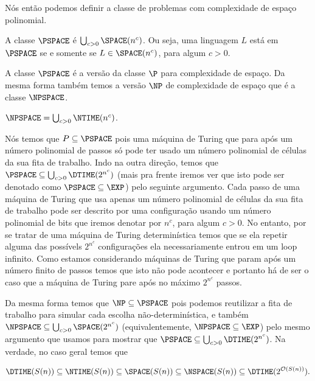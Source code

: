 Nós então podemos definir a classe de problemas com complexidade de espaço polinomial.

\begin{defi}  \label{pspace_defi}

    A classe $\PSPACE$ é $\bigcup_{c > 0} \SPACE(n^{c})$. Ou seja, uma linguagem $L$ está em $\PSPACE$ se e somente se $L \in \SPACE(n^{c})$, para algum $c > 0$.

\end{defi}

A classe $\PSPACE$ é a versão da classe $\P$ para complexidade de espaço. Da mesma forma também temos a versão $\NP$ de complexidade de espaço que é a classe $\NPSPACE$.

\begin{defi}  \label{npspace_defi}

    $\NPSPACE = \bigcup_{c > 0} \NTIME(n^{c})$.

\end{defi}

Nós temos que $P \subseteq \PSPACE$ pois uma máquina de Turing que para após um número polinomial de passos só pode ter usado um número polinomial de células da sua fita de trabalho. Indo na outra direção, temos que $\PSPACE \subseteq \bigcup_{c > 0} \DTIME(2^{n^{c}})$ (mais pra frente iremos ver que isto pode ser denotado como $\PSPACE \subseteq \EXP$) pelo seguinte argumento. Cada passo de uma máquina de Turing que usa apenas um número polinomial de células da sua fita de trabalho pode ser descrito por uma configuração usando um número polinomial de bits que iremos denotar por $n^{c}$, para algum $c > 0$. No entanto, por se tratar de uma máquina de Turing determinística temos que se ela repetir alguma das possívels $2^{n^{c}}$ configurações ela necessariamente entrou em um loop infinito. Como estamos considerando máquinas de Turing que param após um número finito de passos temos que isto não pode acontecer e portanto há de ser o caso que a máquina de Turing pare após no máximo $2^{n^{c}}$ passos.

Da mesma forma temos que $\NP \subseteq \PSPACE$ pois podemos reutilizar a fita de trabalho para simular cada escolha não-determinística, e também $\NPSPACE \subseteq \bigcup_{c > 0} \SPACE(2^{n^{c}})$ (equivalentemente, $\NPSPACE \subseteq \EXP$) pelo mesmo argumento que usamos para mostrar que $\PSPACE \subseteq \bigcup_{c > 0} \DTIME(2^{n^{c}})$. Na verdade, no caso geral temos que

\begin{equation} \label{space_complexity_relations}
    \DTIME(S(n)) \subseteq \NTIME(S(n)) \subseteq \SPACE(S(n)) \subseteq \NSPACE(S(n)) \subseteq \DTIME(2^{\mathcal{O}(S(n))}).
\end{equation}

